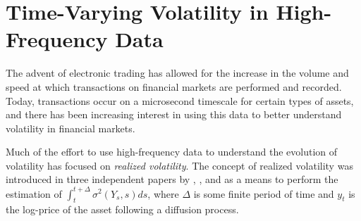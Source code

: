 
\section{Time-Varying Volatility in High-Frequency Data}
The advent of electronic trading has allowed for the increase in the volume and speed at which transactions on financial markets are performed and recorded. Today, transactions occur on a microsecond timescale \citep*{brogaard2010high} for certain types of assets, and there has been increasing interest in using this data to better understand volatility in financial markets. 

Much of the effort to use high-frequency data to understand the evolution of volatility has focused on \textit{realized volatility}. The concept of realized volatility was introduced in three independent papers by \cite{andersen2001distribution}, \cite{barndorff2002estimating}, and \cite{comte1998long} as a means to perform the estimation of $\int_t^{t+\Delta} \sigma^2(Y_s, s) ds$, where $\Delta$ is some finite period of time and $y_t$ is the log-price of the asset following a diffusion process. 


